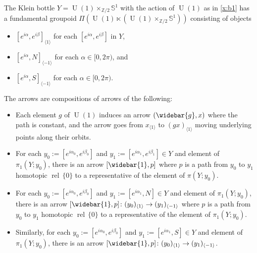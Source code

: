 \documentclass[12pt,reqno]{amsart}
\newcommand{\printname}[1]{}
\renewcommand{\printname}[1]
	{{\color{brown}{\makebox[0pt]{\hspace{-1in}\raisebox{8pt}{\tiny #1}}}}}
\newcommand{\labell}[1]{\label{#1} \printname{#1}}
\renewcommand{\SS}{{\mathbb{S}}} %
\newcommand{\ZZ}{{\mathbb{Z}}}  %
\newcommand{\rel}{{\operatorname{rel}}} %
\newcommand{\U}{{\operatorname{U}}}  %
\theoremstyle{plain}
\theoremstyle{definition}
\newenvironment{example}
		{\pushQED{\qed}\renewcommand{\qedsymbol}{$/\!\!/$}\examplex}
		{\popQED\endexamplex}
\begin{document}
    \begin{example}[{\bf Groupoid B}]\labell{x:b2}  
        The Klein bottle $Y=\U(1)\times_{\ZZ/2}\SS^1$ with the action of $\U(1)$ as in \cref{x:b1} has a fundamental groupoid $\Pi(\U(1)\ltimes(\U(1)\times_{\ZZ/2}\SS^1))$ consisting of objects 
        \begin{itemize}
            \item $[e^{i\alpha},e^{i\beta}]_{\langle 1\rangle}$ for each $[e^{i\alpha},e^{i\beta}]$ in $Y$,
            \item $[e^{i\alpha},N]_{\langle-1\rangle}$ for each $\alpha\in[0,2\pi)$, and
            \item $[e^{i\alpha},S]_{\langle-1\rangle}$ for each $\alpha\in[0,2\pi)$.
        \end{itemize}
        The arrows are compositions of arrows of the following: 
        \begin{itemize}
            \item     Each element $g$ of  $\U(1)$ induces an arrow  $(\widebar{g}, x)$ where the path is constant, and the arrow goes from $x_{\langle 1\rangle}$ to $(gx)_{\langle 1\rangle}$ moving underlying points along their orbits.     
            \item For each $y_0:=[e^{i\alpha_0},e^{i\beta_0}]$ and $y_1:=[e^{i\alpha_1},e^{i\beta_1}]\in Y$ and element of $\pi_1(Y;y_0)$, there is an arrow $[\widebar{1},p]$ where $p$ is a path from $y_0$ to $y_1$ homotopic $\rel\,\{0\}$ to a representative of the element of $\pi(Y;y_0)$.
            \item For each $y_0:=[e^{i\alpha_0},e^{i\beta_0}]$ and $y_1:=[e^{i\alpha_1},N]\in Y$ and element of $\pi_1(Y;y_0)$, there is an arrow $[\widebar{1},p]\colon(y_0)_{\langle1\rangle}\to(y_1)_{\langle-1\rangle}$ where $p$ is a path from $y_0$ to $y_1$ homotopic $\rel\,\{0\}$ to a representative of the element of $\pi_1(Y;y_0)$.
            \item Similarly, for each $y_0:=[e^{i\alpha_0},e^{i\beta_0}]$ and $y_1:=[e^{i\alpha_1},S]\in Y$ and element of $\pi_1(Y;y_0)$, there is an arrow $[\widebar{1},p]\colon(y_0)_{\langle1\rangle}\to(y_1)_{\langle-1\rangle}$.\qedhere
        \end{itemize}
    \end{example}    
\end{document}
